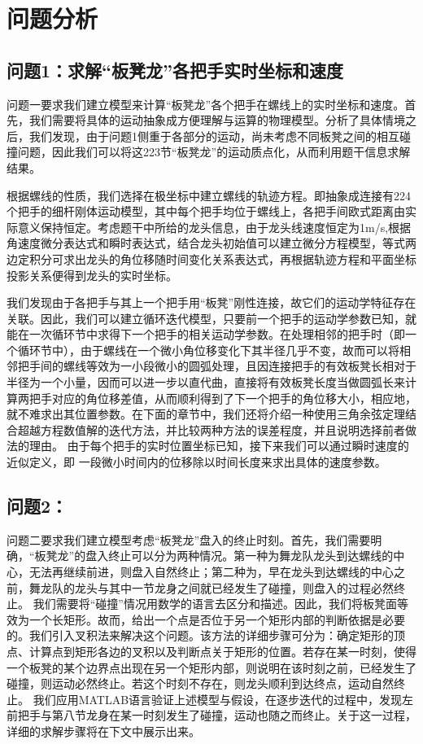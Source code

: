 \documentclass{cumcmthesis1}
\begin{document}
\section{问题分析}
\subsection{\textbf{问题1}：求解“板凳龙”各把手实时坐标和速度}
\par
问题一要求我们建立模型来计算“板凳龙”各个把手在螺线上的实时坐标和速度。首先，我们需要将具体的运动抽象成方便理解与运算的物理模型。分析了具体情境之后，我们发现，由于问题1侧重于各部分的运动，尚未考虑不同板凳之间的相互碰撞问题，因此我们可以将这223节“板凳龙”的运动质点化，从而利用题干信息求解结果。\par
根据螺线的性质，我们选择在极坐标中建立螺线的轨迹方程。即抽象成连接有224个把手的细杆刚体运动模型，其中每个把手均位于螺线上，各把手间欧式距离由实际意义保持恒定。考虑题干中所给的龙头信息，由于龙头线速度恒定为1m/s,根据角速度微分表达式和瞬时表达式，结合龙头初始值可以建立微分方程模型，等式两边定积分可求出龙头的角位移随时间变化关系表达式，再根据轨迹方程和平面坐标投影关系便得到龙头的实时坐标。
\par
我们发现由于各把手与其上一个把手用“板凳”刚性连接，故它们的运动学特征存在关联。因此，我们可以建立循环迭代模型，只要前一个把手的运动学参数已知，就能在一次循环节中求得下一个把手的相关运动学参数。在处理相邻的把手时（即一个循环节中），由于螺线在一个微小角位移变化下其半径几乎不变，故而可以将相邻把手间的螺线等效为一小段微小的圆弧处理，且因连接把手的有效板凳长相对于半径为一个小量，因而可以进一步以直代曲，直接将有效板凳长度当做圆弧长来计算两把手对应的角位移差值，从而顺利得到了下一个把手的角位移大小，相应地，就不难求出其位置参数。在下面的章节中，我们还将介绍一种使用三角余弦定理结合超越方程数值解的迭代方法，并比较两种方法的误差程度，并且说明选择前者做法的理由。
由于每个把手的实时位置坐标已知，接下来我们可以通过瞬时速度的近似定义，即
一段微小时间内的位移除以时间长度来求出具体的速度参数。
\subsection{\textbf{问题2}：}
问题二要求我们建立模型考虑“板凳龙”盘入的终止时刻。首先，我们需要明确，“板凳龙”的盘入终止可以分为两种情况。第一种为舞龙队龙头到达螺线的中心，无法再继续前进，则盘入自然终止；第二种为，早在龙头到达螺线的中心之前，舞龙队的龙头与其中一节龙身之间就已经发生了碰撞，则盘入的过程必然终止。
我们需要将“碰撞”情况用数学的语言去区分和描述。因此，我们将板凳面等效为一个长矩形。故而，给出一个点是否位于另一个矩形内部的判断依据是必要的。我们引入叉积法来解决这个问题。该方法的详细步骤可分为：确定矩形的顶点、计算点到矩形各边的叉积以及判断点关于矩形的位置。若存在某一时刻，使得一个板凳的某个边界点出现在另一个矩形内部，则说明在该时刻之前，已经发生了碰撞，则运动必然终止。若这个时刻不存在，则龙头顺利到达终点，运动自然终止。
我们应用MATLAB语言验证上述模型与假设，在逐步迭代的过程中，发现左前把手与第八节龙身在某一时刻发生了碰撞，运动也随之而终止。关于这一过程，详细的求解步骤将在下文中展示出来。
\end{document}
